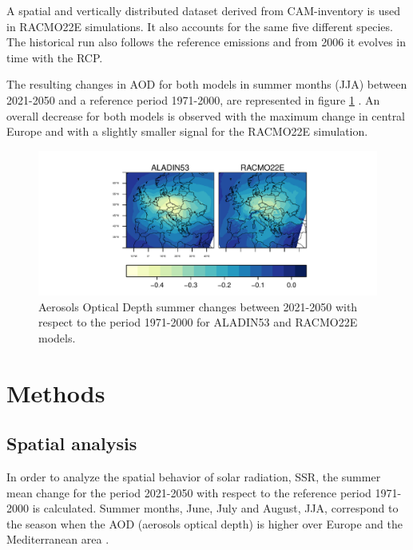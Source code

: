 A spatial and vertically distributed dataset derived from CAM-inventory \cite*{Lamarque2010} is used in RACMO22E simulations. It also accounts for the same five different species. The historical run also follows the reference emissions \cite*{Lamarque2010} and from 2006 it evolves in time with the RCP.

The resulting changes in AOD for both models in summer months (JJA) between 2021-2050 and a reference period 1971-2000, are represented in figure \ref{fig:aod} . An overall decrease for both models is observed with the maximum change in central Europe and with a slightly smaller signal for the RACMO22E simulation.

\begin{figure}[h!]
\centering\includegraphics[width=1\textwidth]{figs/capitulo7/ANOMALIAS_JJA_AOD_2050-2021_r12.pdf}
\caption[Aerosol optical depth summer anomalies between 2050-2021 with respect to 1971-2000 over Europe]{Aerosols Optical Depth summer changes between 2021-2050 with respect to the period 1971-2000 for ALADIN53 and RACMO22E models.}
\label{fig:aod}
\end{figure}

{\section{Methods}\label{Methods}}

\subsection{Spatial analysis}

In order to analyze the spatial behavior of solar radiation, SSR, the summer mean change for the period 2021-2050 with respect to the reference period 1971-2000 is calculated. Summer months, June, July and August, JJA, correspond to the season when the AOD (aerosols optical depth) is higher over Europe and the Mediterranean area \cite*{Lelieveld}.

